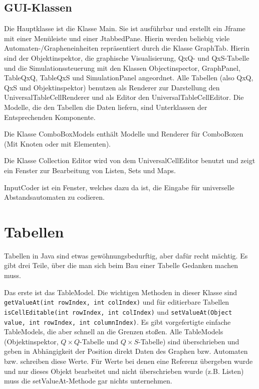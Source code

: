 \subsection{GUI-Klassen}
Die Hauptklasse ist die Klasse Main. Sie ist ausführbar und erstellt ein Jframe mit einer Menüleiste und einer JtabbedPane. Hierin werden beliebig viele Automaten-/Grapheneinheiten repräsentiert durch die Klasse GraphTab. Hierin sind der Objektinspektor, die graphische Visualisierung, QxQ- und QxS-Tabelle und die Simulationssteuerung mit den Klassen Objectinspector, GraphPanel, TableQxQ, TableQxS und SimulationPanel angeordnet. Alle Tabellen (also QxQ, QxS und Objektinspektor) benutzen als Renderer zur Darstellung den UniversalTableCellRenderer und als Editor den UniversalTableCellEditor. Die Modelle, die den Tabellen die Daten liefern, sind Unterklassen der Entsprechenden Komponente.

Die Klasse ComboBoxModels enthält Modelle und Renderer für ComboBoxen (Mit Knoten oder mit Elementen).

Die Klasse Collection Editor wird von dem UniversalCellEditor benutzt und zeigt ein Fenster zur Bearbeitung von Listen, Sets und Maps.

InputCoder ist ein Fenster, welches dazu da ist, die Eingabe für universelle Abstandsautomaten zu codieren.

\section{Tabellen}
Tabellen in Java sind etwas gewöhnungsbedurftig, aber dafür recht mächtig. Es gibt drei Teile, über die man sich beim Bau einer Tabelle Gedanken machen muss.

Das erste ist das TableModel. Die wichtigen Methoden in dieser Klasse sind \lstinline[breaklines=true]{getValueAt(int rowIndex, int colIndex)} und für editierbare Tabellen \lstinline[breaklines=true]{isCellEditable(int rowIndex, int colIndex)} und \lstinline[breaklines=true]{setValueAt(Object value, int rowIndex, int columnIndex)}. Es gibt vorgefertigte einfache TableModels, die aber schnell an die Grenzen stoßen. Alle TableModels (Objektinspektor, $Q \times Q$-Tabelle und $Q \times S$-Tabelle) sind überschrieben und geben in Abhängigkeit der Position direkt Daten des Graphen bzw. Automaten bzw. schreiben diese Werte. Für Werte bei denen eine Referenz übergeben wurde und nur dieses Objekt bearbeitet und nicht überschrieben wurde (z.B. Listen) muss die setValueAt-Methode gar nichts unternehmen.

